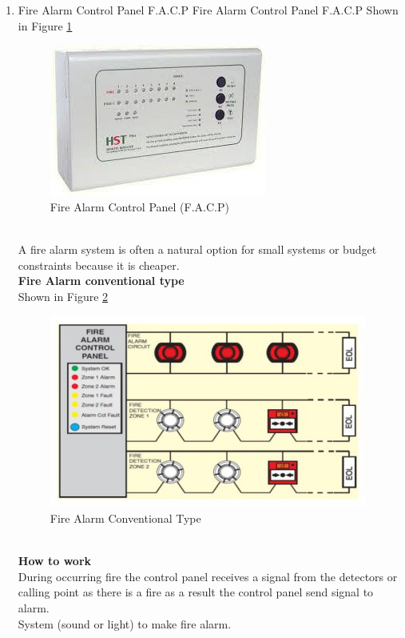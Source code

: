 \documentclass[12pt,fleqn]{book} %
\begin{document}
\begin{enumerate}
    \item Fire Alarm Control Panel F.A.C.P
    Fire Alarm Control Panel F.A.C.P Shown in Figure \ref{fig:hamdy 43}
    \begin{figure}[!h]
    \centering
    \includegraphics[width=0.5\linewidth]{hamdy 43.png}
    \caption{Fire Alarm Control Panel (F.A.C.P)}
    \label{fig:hamdy 43}
    \end{figure}
   \\ A fire alarm system is often a natural option for small systems or budget constraints because it is cheaper.
   \\ \textbf{Fire Alarm conventional type}
   \\ Shown in Figure \ref{fig:hamdy 44}
    \begin{figure}[!h]
    \centering
    \includegraphics[width=0.9\linewidth]{hamdy 44.png}
    \caption{Fire Alarm Conventional Type}
    \label{fig:hamdy 44}
    \end{figure}
    \\ \textbf{How to work}
    \\ During occurring fire the control panel receives a signal from the detectors or calling point as there is a fire as a result the control panel send signal to alarm.
    \\ System (sound or light) to make fire alarm.

\end{enumerate}
\end{document}
